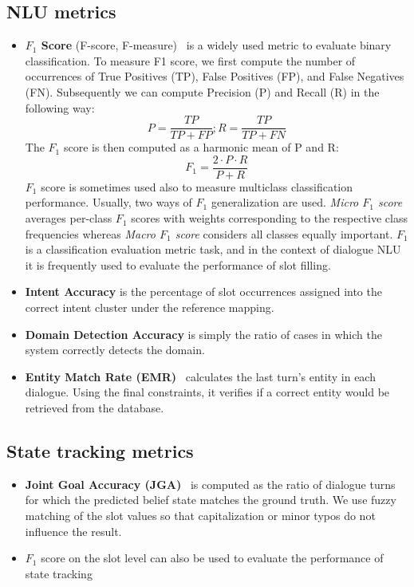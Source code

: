 \subsection{NLU metrics}
    \begin{itemize}
        \item \textbf{$F_1$ Score} (F-score, F-measure)~\cite{goutte2005probabilistic} is a widely used metric to evaluate binary classification.
    To measure F1 score, we first compute the number of occurrences of True Positives (TP), False Positives (FP), and False Negatives (FN).
    Subsequently we can compute Precision (P) and Recall (R) in the following way:
    \begin{equation*}
        P = \frac{TP}{TP + FP}; R = \frac{TP}{TP + FN}
    \end{equation*}
    The $F_1$ score is then computed as a harmonic mean of P and R:
    \begin{equation*}
        F_1 = \frac{2\cdot P \cdot R}{P + R}
    \end{equation*}
    $F_1$ score is sometimes used also to measure multiclass classification performance.
    Usually, two ways of $F_1$ generalization are used. \emph{Micro $F_1$ score} averages per-class $F_1$ scores with weights corresponding to the respective class frequencies whereas \emph{Macro $F_1$ score} considers all classes equally important.
    $F_1$ is a classification evaluation metric task, and in the context of dialogue NLU it is frequently used to evaluate the performance of slot filling.
        \item \textbf{Intent Accuracy} is the percentage of slot occurrences assigned into the correct intent cluster under the reference mapping.
        \item \textbf{Domain Detection Accuracy} is simply the ratio of cases in which the system correctly detects the domain.
        \item \textbf{Entity Match Rate (EMR)}~\cite{wen2016network} calculates the last turn's entity in each dialogue. Using the final constraints, it verifies if a correct entity would be retrieved from the database.
    \end{itemize}
\subsection{State tracking metrics}
    \begin{itemize}
    \item \textbf{Joint Goal Accuracy (JGA)}~\cite{mrkvsic2016neural} is computed as the ratio of dialogue turns for which the predicted belief state matches the ground truth.
    We use fuzzy matching of the slot values so that capitalization or minor typos do not influence the result.
    \item $F_1$ score on the slot level can also be used to evaluate the performance of state tracking
    \end{itemize}
